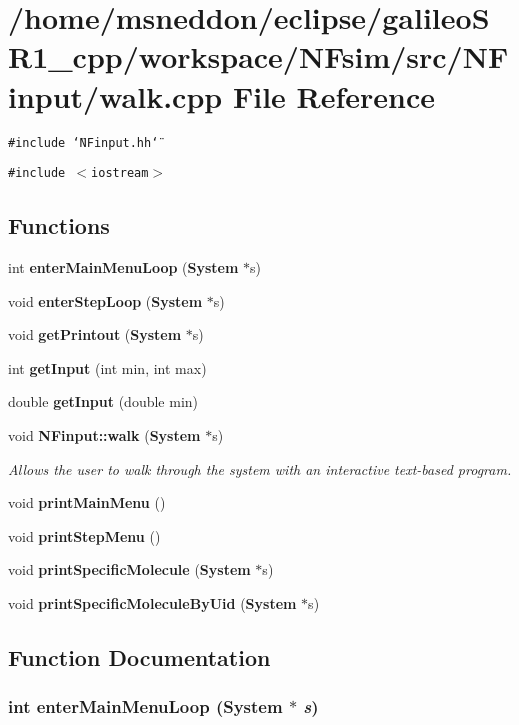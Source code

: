 \section{/home/msneddon/eclipse/galileoSR1\_\-cpp/workspace/NFsim/src/NFinput/walk.cpp File Reference}
\label{walk_8cpp}


{\tt \#include \char`\"{}NFinput.hh\char`\"{}}\par
{\tt \#include $<$iostream$>$}\par
\subsection*{Functions}
\begin{CompactItemize}
\item 
int {\bf enterMainMenuLoop} ({\bf System} $\ast$s)
\item 
void {\bf enterStepLoop} ({\bf System} $\ast$s)
\item 
void {\bf getPrintout} ({\bf System} $\ast$s)
\item 
int {\bf getInput} (int min, int max)
\item 
double {\bf getInput} (double min)
\item 
void {\bf NFinput::walk} ({\bf System} $\ast$s)
\begin{CompactList}\small\item\em Allows the user to walk through the system with an interactive text-based program. \item\end{CompactList}\item 
void {\bf printMainMenu} ()
\item 
void {\bf printStepMenu} ()
\item 
void {\bf printSpecificMolecule} ({\bf System} $\ast$s)
\item 
void {\bf printSpecificMoleculeByUid} ({\bf System} $\ast$s)
\end{CompactItemize}


\subsection{Function Documentation}
\subsubsection{\setlength{\rightskip}{0pt plus 5cm}int enterMainMenuLoop ({\bf System} $\ast$ {\em s})}\label{walk_8cpp_863793acef9098334f0848f1248f1751}


